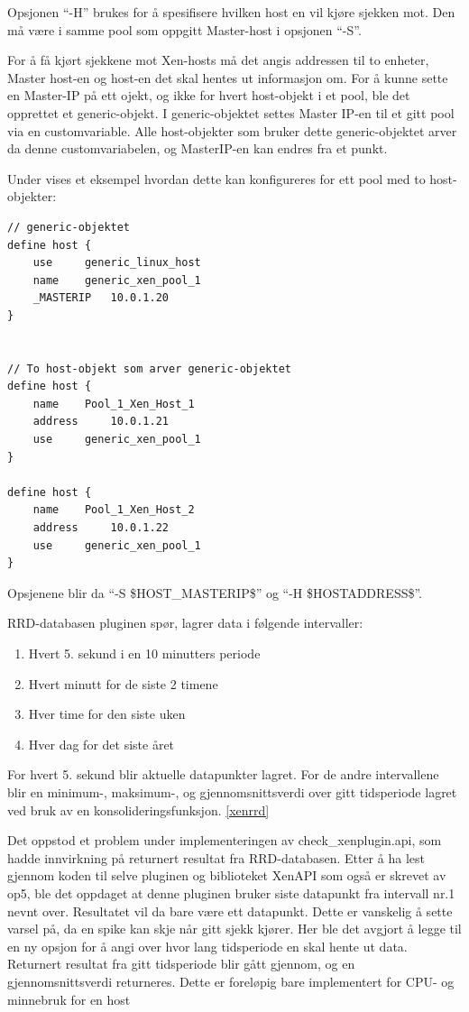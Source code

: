 Opsjonen ``-H'' brukes for å spesifisere hvilken host en vil kjøre sjekken mot. Den må være i samme pool som oppgitt Master-host i opsjonen ``-S''.

For å få kjørt sjekkene mot Xen-hosts må det angis addressen til to enheter, Master host-en og host-en det skal hentes ut informasjon om. For å kunne sette en Master-IP på ett ojekt, og ikke for hvert host-objekt i et pool, ble det opprettet et generic-objekt. I generic-objektet settes Master IP-en til et gitt pool via en customvariable. Alle host-objekter som bruker dette generic-objektet arver da denne customvariabelen, og MasterIP-en kan endres fra et punkt.

Under vises et eksempel hvordan dette kan konfigureres for ett pool med to host-objekter:
\begin{lstlisting}[style=example]
// generic-objektet
define host {
    use 	generic_linux_host
    name 	generic_xen_pool_1
    _MASTERIP 	10.0.1.20
}


// To host-objekt som arver generic-objektet
define host {
    name 	Pool_1_Xen_Host_1
    address 	10.0.1.21
    use 	generic_xen_pool_1
}

define host {
    name 	Pool_1_Xen_Host_2
    address 	10.0.1.22
    use 	generic_xen_pool_1
}
\end{lstlisting}

Opsjenene blir da ``-S \$HOST\_MASTERIP\$'' og ``-H \$HOSTADDRESS\$''.

RRD-databasen pluginen spør, lagrer data i følgende intervaller:

\begin{enumerate}
        \item Hvert 5. sekund i en 10 minutters periode
        \item Hvert minutt for de siste 2 timene
	\item Hver time for den siste uken
        \item Hver dag for det siste året
\end{enumerate}

For hvert 5. sekund blir aktuelle datapunkter lagret. For de andre intervallene blir en minimum-, maksimum-, og gjennomsnittsverdi over gitt tidsperiode lagret ved bruk av en konsolideringsfunksjon. \ref{xenrrd}

Det oppstod et problem under implementeringen av check\_xenplugin.api, som hadde innvirkning på returnert resultat fra RRD-databasen. Etter å ha lest gjennom koden til selve pluginen og biblioteket XenAPI som også er skrevet av op5, ble det oppdaget at denne pluginen bruker siste datapunkt fra intervall nr.1 nevnt over. Resultatet vil da bare være ett datapunkt. Dette er vanskelig å sette varsel på, da en spike kan skje når gitt sjekk kjører. Her ble det avgjort å legge til en ny opsjon for å angi over hvor lang tidsperiode en skal hente ut data. Returnert resultat fra gitt tidsperiode blir gått gjennom, og en gjennomsnittsverdi returneres. Dette er foreløpig bare implementert for CPU- og minnebruk for en host

